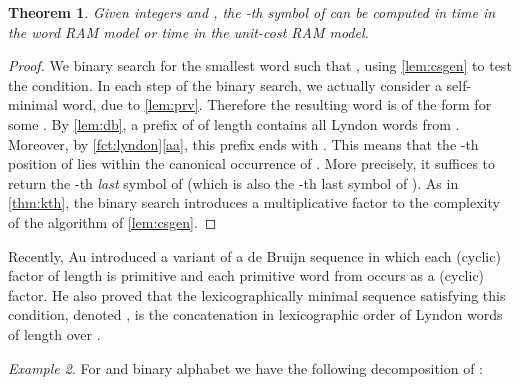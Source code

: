\documentclass{article}
\newcommand{\mayqed}{}
\newtheorem{theorem}{Theorem}
\theoremstyle{definition}
\theoremstyle{remark}
\newtheorem{example}[theorem]{Example}
\begin{document}
\begin{theorem}\label{thm:random-access}
  Given integers  and , the -th symbol of  can be computed
  in  time in the word RAM model or  time in the unit-cost RAM model.
\end{theorem}
\begin{proof}
  We binary search for the smallest word  
  such that , using \cref{lem:csgen} to test the condition.
  In each step of the binary search, we actually consider a self-minimal word, due to \cref{lem:prv}.
  Therefore the resulting word  is of the form  for some .
  By \cref{lem:db}, a prefix of  of length  contains all Lyndon words from .
  Moreover, by \cref{fct:lyndon}\ref{aa}, this prefix ends with .
This means that the -th position of  lies within the canonical
  occurrence of . More precisely, it suffices
  to return the -th \emph{last} symbol of 
  (which is also the -th last symbol of ).
  As in \cref{thm:kth}, the binary search introduces a multiplicative
   factor to the complexity of the algorithm of \cref{lem:csgen}. 
\mayqed\end{proof}

Recently, Au \cite{DBLP:journals/dm/Au15} introduced a variant of a de Bruijn sequence
in which each (cyclic) factor of length  is primitive and each primitive word from  occurs as a (cyclic) factor.
He also proved that the lexicographically minimal sequence satisfying this condition,
denoted , is the concatenation in lexicographic order of Lyndon words of length  over .

\begin{example}
  For  and binary alphabet we have the following decomposition of :
{ 
}
\end{example}
\end{document}
